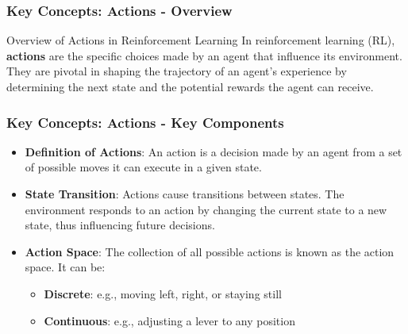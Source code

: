 \documentclass{beamer}
\begin{document}
\begin{frame}[fragile]
    \frametitle{Key Concepts: Actions - Overview}
    \begin{block}{Overview of Actions in Reinforcement Learning}
        In reinforcement learning (RL), \textbf{actions} are the specific choices made by an agent that influence its environment. They are pivotal in shaping the trajectory of an agent's experience by determining the next state and the potential rewards the agent can receive.
    \end{block}
\end{frame}

\begin{frame}[fragile]
    \frametitle{Key Concepts: Actions - Key Components}
    \begin{itemize}
        \item \textbf{Definition of Actions}: An action is a decision made by an agent from a set of possible moves it can execute in a given state.
        
        \item \textbf{State Transition}: Actions cause transitions between states. The environment responds to an action by changing the current state to a new state, thus influencing future decisions.
        
        \item \textbf{Action Space}: The collection of all possible actions is known as the action space. It can be:
        \begin{itemize}
            \item \textbf{Discrete}: e.g., moving left, right, or staying still
            \item \textbf{Continuous}: e.g., adjusting a lever to any position
        \end{itemize}
    \end{itemize}
\end{frame}
\end{document}
